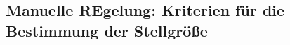 \subsection{Manuelle REgelung: Kriterien für die Bestimmung der Stellgröße} %
\label{sub:Manuelle_REgelung:_Kriterien_für_die_Bestimmung_der_Stellgröße}

